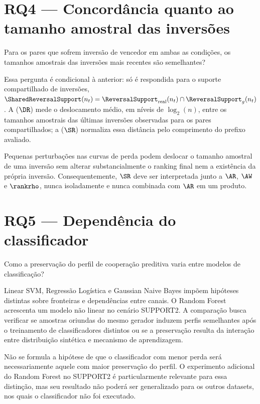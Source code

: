 \section{RQ4 --- Concordância quanto ao tamanho amostral das inversões}

\begin{researchquestionbox}[RQ4]
Para os pares que sofrem inversão de vencedor em ambas as condições, os tamanhos amostrais das inversões mais recentes são semelhantes?
\end{researchquestionbox}

Essa pergunta é condicional à anterior: só é respondida para o suporte compartilhado de inversões, $\SharedReversalSupport(n_t) = \ReversalSupport_{\mathrm{real}}(n_t) \cap \ReversalSupport_g(n_t)$. A \MeanLogReversalDistance{} ($\DR$) mede o deslocamento médio, em níveis de $\log_2(n)$, entre os tamanhos amostrais das últimas inversões observadas para os pares compartilhados; a \ReversalSampleSizeSimilarity{} ($\SR$) normaliza essa distância pelo comprimento do prefixo avaliado.

Pequenas perturbações nas curvas de perda podem deslocar o tamanho amostral de uma inversão sem alterar substancialmente o ranking final nem a existência da própria inversão. Consequentemente, $\SR$ deve ser interpretada junto a $\AR$, $\AW$ e $\rankrho$, nunca isoladamente e nunca combinada com $\AR$ em um produto.

\section{RQ5 --- Dependência do classificador}

\begin{researchquestionbox}[RQ5]
Como a preservação do perfil de cooperação preditiva varia entre modelos de classificação?
\end{researchquestionbox}

Linear SVM, Regressão Logística e Gaussian Naive Bayes impõem hipóteses distintas sobre fronteiras e dependências entre canais. O Random Forest acrescenta um modelo não linear no cenário SUPPORT2. A comparação busca verificar se amostras oriundas do mesmo gerador induzem perfis semelhantes após o treinamento de classificadores distintos ou se a preservação resulta da interação entre distribuição sintética e mecanismo de aprendizagem.

Não se formula a hipótese de que o classificador com menor perda será necessariamente aquele com maior preservação do perfil. O experimento adicional do Random Forest no SUPPORT2 é particularmente relevante para essa distinção, mas seu resultado não poderá ser generalizado para os outros datasets, nos quais o classificador não foi executado.

